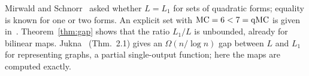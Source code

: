 \begin{remark}
Mirwald and Schnorr~\cite{MS92} asked whether $L=L_1$ for sets of quadratic forms; equality is known for one or two forms. An explicit set with $\operatorname{MC}=6<7=\operatorname{qMC}$ is given in~\cite{Ob26}. Theorem~\ref{thm:gap} shows that the ratio $L_1/L$ is unbounded, already for bilinear maps. Jukna~\cite{Ju06} (Thm.~2.1) gives an $\Omega(n/\log n)$ gap between $L$ and $L_1$ for representing graphs, a partial single-output function; here the maps are computed exactly.
\end{remark}
